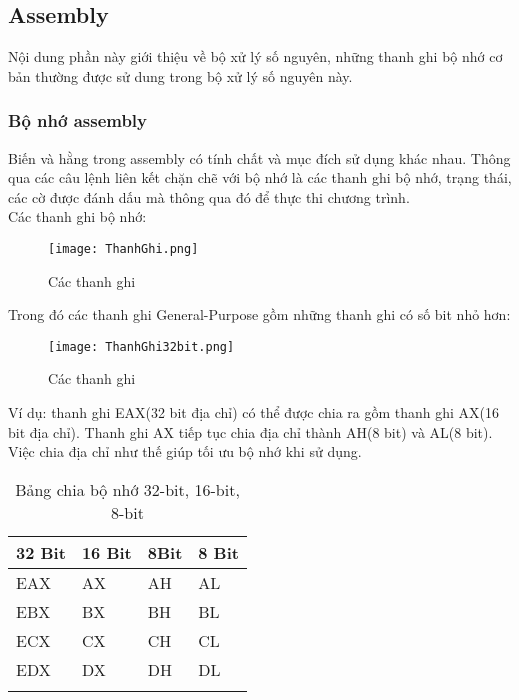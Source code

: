 	\subsection{Assembly}
	Nội dung phần này giới thiệu về bộ xử lý số nguyên, những thanh ghi bộ nhớ cơ bản thường được sử dung trong bộ xử lý số nguyên này.
		\subsubsection{Bộ nhớ assembly}	
		 Biến và hằng trong assembly có tính chất và mục đích sử dụng khác nhau. Thông qua các câu lệnh liên kết chặn chẽ với bộ nhớ là các thanh ghi bộ nhớ, trạng thái, các cờ được đánh dấu mà thông qua đó để thực thi chương trình.\\

		Các thanh ghi bộ nhớ:		
		\begin{center}
			\begin{figure}[htp]
				\begin{center}
					\texttt{[image: ThanhGhi.png]}
				\end{center}
				\caption{Các thanh ghi \protect\footnotemark}
				\label{fig:Flow}
			\end{figure}
		\end{center} 
	
	\newpage
		Trong đó các thanh ghi General-Purpose gồm những thanh ghi có số bit nhỏ hơn:	
		\begin{center}
			\begin{figure}[htp]
				\begin{center}
					\texttt{[image: ThanhGhi32bit.png]}
				\end{center}
				\caption{ Các thanh ghi \protect\footnotemark}
				\label{fig:Flow}
			\end{figure}
		\end{center}
		
		Ví dụ: thanh ghi EAX(32 bit địa chỉ) có thể được chia ra gồm thanh ghi AX(16 bit địa chỉ). Thanh ghi AX tiếp tục chia địa chỉ thành AH(8 bit) và AL(8 bit). Việc chia địa chỉ như thế giúp tối ưu bộ nhớ khi sử dụng.
		\begin{longtable}{ | m{3cm} | m{3cm} | m{3cm}  | m{3cm}| }
			\hline
				32 Bit & 16 Bit & 8Bit & 8 Bit\\
			\hline
			\hline
				EAX & AX	& AH	 & AL\\
			\hline			
				EBX & BX	& BH	 & BL\\
			\hline		
				ECX & CX	& CH	 & CL\\		
			\hline
				EDX & DX	& DH	 & DL\\
			\hline
			\caption{Bảng chia bộ nhớ 32-bit, 16-bit, 8-bit}
			\label{table:tbthanhghi}
		\end{longtable}
		

